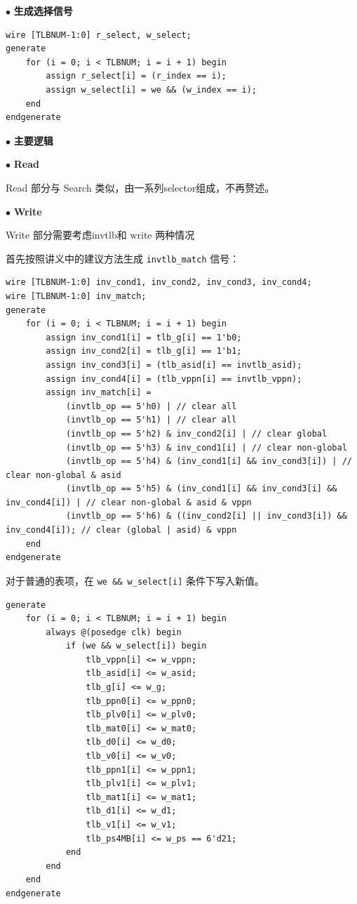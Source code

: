 \noindent
$\bullet$
\textbf{生成选择信号}

\begin{lstlisting}
wire [TLBNUM-1:0] r_select, w_select;
generate
    for (i = 0; i < TLBNUM; i = i + 1) begin
        assign r_select[i] = (r_index == i);
        assign w_select[i] = we && (w_index == i);
    end
endgenerate
\end{lstlisting}

\noindent
$\bullet$
\textbf{主要逻辑}

$\bullet$ \textbf{Read}

Read 部分与 Search 类似，由一系列selector组成，不再赘述。

$\bullet$ \textbf{Write}

Write 部分需要考虑invtlb和 write 两种情况

首先按照讲义中的建议方法生成 \verb|invtlb_match| 信号：

\begin{lstlisting}
wire [TLBNUM-1:0] inv_cond1, inv_cond2, inv_cond3, inv_cond4;
wire [TLBNUM-1:0] inv_match;
generate
    for (i = 0; i < TLBNUM; i = i + 1) begin
        assign inv_cond1[i] = tlb_g[i] == 1'b0;
        assign inv_cond2[i] = tlb_g[i] == 1'b1;
        assign inv_cond3[i] = (tlb_asid[i] == invtlb_asid);
        assign inv_cond4[i] = (tlb_vppn[i] == invtlb_vppn);
        assign inv_match[i] =
            (invtlb_op == 5'h0) | // clear all
            (invtlb_op == 5'h1) | // clear all
            (invtlb_op == 5'h2) & inv_cond2[i] | // clear global
            (invtlb_op == 5'h3) & inv_cond1[i] | // clear non-global
            (invtlb_op == 5'h4) & (inv_cond1[i] && inv_cond3[i]) | // clear non-global & asid
            (invtlb_op == 5'h5) & (inv_cond1[i] && inv_cond3[i] && inv_cond4[i]) | // clear non-global & asid & vppn
            (invtlb_op == 5'h6) & ((inv_cond2[i] || inv_cond3[i]) && inv_cond4[i]); // clear (global | asid) & vppn
    end
endgenerate
\end{lstlisting}

对于普通的表项，在 \verb|we && w_select[i]| 条件下写入新值。

\begin{lstlisting}
generate
    for (i = 0; i < TLBNUM; i = i + 1) begin
        always @(posedge clk) begin
            if (we && w_select[i]) begin
                tlb_vppn[i] <= w_vppn;
                tlb_asid[i] <= w_asid;
                tlb_g[i] <= w_g;
                tlb_ppn0[i] <= w_ppn0;
                tlb_plv0[i] <= w_plv0;
                tlb_mat0[i] <= w_mat0;
                tlb_d0[i] <= w_d0;
                tlb_v0[i] <= w_v0;
                tlb_ppn1[i] <= w_ppn1;
                tlb_plv1[i] <= w_plv1;
                tlb_mat1[i] <= w_mat1;
                tlb_d1[i] <= w_d1;
                tlb_v1[i] <= w_v1;
                tlb_ps4MB[i] <= w_ps == 6'd21;
            end
        end
    end
endgenerate
\end{lstlisting}

